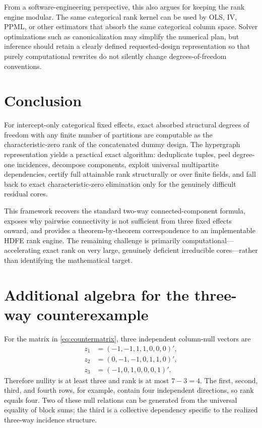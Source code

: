 \documentclass[11pt]{article}
\theoremstyle{definition}
\newcommand{\1}{\mathbf{1}}
\begin{document}
From a software-engineering perspective, this also argues for keeping the rank engine modular. The same categorical rank kernel can be used by OLS, IV, PPML, or other estimators that absorb the same categorical column space. Solver optimizations such as canonicalization may simplify the numerical plan, but inference should retain a clearly defined requested-design representation so that purely computational rewrites do not silently change degrees-of-freedom conventions.

\section{Conclusion}

For intercept-only categorical fixed effects, exact absorbed structural degrees of freedom with any finite number of partitions are computable as the characteristic-zero rank of the concatenated dummy design. The hypergraph representation yields a practical exact algorithm: deduplicate tuples, peel degree-one incidences, decompose components, exploit universal multipartite dependencies, certify full attainable rank structurally or over finite fields, and fall back to exact characteristic-zero elimination only for the genuinely difficult residual cores.

This framework recovers the standard two-way connected-component formula, exposes why pairwise connectivity is not sufficient from three fixed effects onward, and provides a theorem-by-theorem correspondence to an implementable HDFE rank engine. The remaining challenge is primarily computational---accelerating exact rank on very large, genuinely deficient irreducible cores---rather than identifying the mathematical target.

\appendix

\section{Additional algebra for the three-way counterexample}

For the matrix in \eqref{eq:countermatrix}, three independent column-null vectors are
\begin{align*}
 z_1 &= (-1,-1,1,1,0,0,0)',\\
 z_2 &= (0,-1,-1,0,1,1,0)',\\
 z_3 &= (-1,0,1,0,0,0,1)'.
\end{align*}
Therefore nullity is at least three and rank is at most $7-3=4$. The first, second, third, and fourth rows, for example, contain four independent directions, so rank equals four. Two of these null relations can be generated from the universal equality of block sums; the third is a collective dependency specific to the realized three-way incidence structure.
\end{document}
